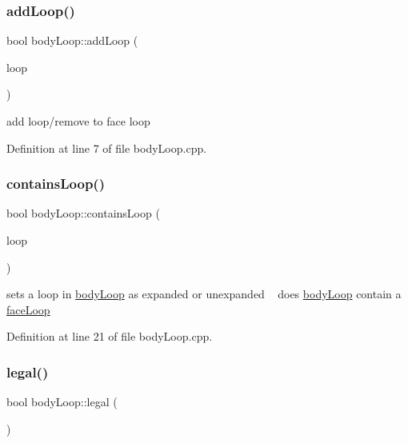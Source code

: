 \subsubsection{\texorpdfstring{add\+Loop()}{addLoop()}}
{\footnotesize\ttfamily bool body\+Loop\+::add\+Loop (\begin{DoxyParamCaption}\item[{\mbox{\hyperlink{classface_loop}{face\+Loop}}}]{loop }\end{DoxyParamCaption})}

add loop/remove to face loop 

Definition at line 7 of file body\+Loop.\+cpp.

\mbox{\label{classbody_loop_afcbfd878ef953951d47c2564091b9442}} 
\subsubsection{\texorpdfstring{contains\+Loop()}{containsLoop()}}
{\footnotesize\ttfamily bool body\+Loop\+::contains\+Loop (\begin{DoxyParamCaption}\item[{\mbox{\hyperlink{classface_loop}{face\+Loop}}}]{loop }\end{DoxyParamCaption})}

sets a loop in \mbox{\hyperlink{classbody_loop}{body\+Loop}} as \textquotesingle{}expanded\textquotesingle{} or \textquotesingle{}unexpanded\textquotesingle{} ~\newline
does \mbox{\hyperlink{classbody_loop}{body\+Loop}} contain a \mbox{\hyperlink{classface_loop}{face\+Loop}} 

Definition at line 21 of file body\+Loop.\+cpp.

\mbox{\label{classbody_loop_a328d9291b9baae26a01b39d9ff7fbd7d}} 
\subsubsection{\texorpdfstring{legal()}{legal()}}
{\footnotesize\ttfamily bool body\+Loop\+::legal (\begin{DoxyParamCaption}{ }\end{DoxyParamCaption})}

